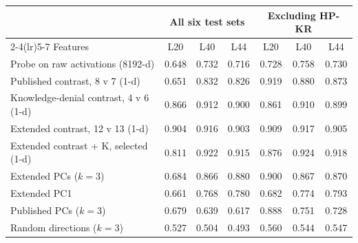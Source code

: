 \begin{tabular}{lcccccc}
\toprule
 & \multicolumn{3}{c}{All six test sets} & \multicolumn{3}{c}{Excluding HP-KR} \\
\cmidrule(lr){2-4}\cmidrule(lr){5-7}
Features & L20 & L40 & L44 & L20 & L40 & L44 \\
\midrule
Probe on raw activations (8192-d) & 0.648 & 0.732 & 0.716 & 0.728 & 0.758 & 0.730 \\
\midrule
Published contrast, 8 v 7 (1-d) & 0.651 & 0.832 & 0.826 & 0.919 & 0.880 & 0.873 \\
Knowledge-denial contrast, 4 v 6 (1-d) & 0.866 & 0.912 & 0.900 & 0.861 & 0.910 & 0.899 \\
Extended contrast, 12 v 13 (1-d) & 0.904 & 0.916 & 0.903 & 0.909 & 0.917 & 0.905 \\
Extended contrast + K, selected (1-d) & 0.811 & 0.922 & 0.915 & 0.876 & 0.924 & 0.918 \\
\midrule
Extended PCs ($k=3$) & 0.684 & 0.866 & 0.880 & 0.900 & 0.867 & 0.870 \\
Extended PC1 & 0.661 & 0.768 & 0.780 & 0.682 & 0.774 & 0.793 \\
Published PCs ($k=3$) & 0.679 & 0.639 & 0.617 & 0.888 & 0.751 & 0.728 \\
Random directions ($k=3$) & 0.527 & 0.504 & 0.493 & 0.560 & 0.544 & 0.547 \\
\bottomrule
\end{tabular}
